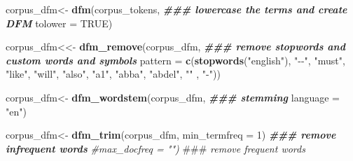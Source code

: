 \documentclass[
]{article}
\newenvironment{Shaded}{\begin{snugshade}}{\end{snugshade}}
\newcommand{\AlertTok}[1]{\textcolor[rgb]{0.94,0.16,0.16}{#1}}
\newcommand{\AttributeTok}[1]{\textcolor[rgb]{0.13,0.29,0.53}{#1}}
\newcommand{\CommentTok}[1]{\textcolor[rgb]{0.56,0.35,0.01}{\textit{#1}}}
\newcommand{\ConstantTok}[1]{\textcolor[rgb]{0.56,0.35,0.01}{#1}}
\newcommand{\DecValTok}[1]{\textcolor[rgb]{0.00,0.00,0.81}{#1}}
\newcommand{\DocumentationTok}[1]{\textcolor[rgb]{0.56,0.35,0.01}{\textbf{\textit{#1}}}}
\newcommand{\FunctionTok}[1]{\textcolor[rgb]{0.13,0.29,0.53}{\textbf{#1}}}
\newcommand{\NormalTok}[1]{#1}
\newcommand{\OtherTok}[1]{\textcolor[rgb]{0.56,0.35,0.01}{#1}}
\newcommand{\StringTok}[1]{\textcolor[rgb]{0.31,0.60,0.02}{#1}}
\begin{document}
\begin{Shaded}
\begin{Highlighting}[]
\NormalTok{corpus\_dfm}\OtherTok{\textless{}{-}} \FunctionTok{dfm}\NormalTok{(corpus\_tokens,                                           }\DocumentationTok{\#\#\# lowercase the terms and create DFM}
                       \AttributeTok{tolower =} \ConstantTok{TRUE}\NormalTok{)}
\end{Highlighting}
\end{Shaded}

\begin{Shaded}
\begin{Highlighting}[]
\NormalTok{corpus\_dfm}\OtherTok{\textless{}\textless{}{-}}  \FunctionTok{dfm\_remove}\NormalTok{(corpus\_dfm,                                     }\DocumentationTok{\#\#\# remove stopwords and custom words and symbols }
                        \AttributeTok{pattern =} \FunctionTok{c}\NormalTok{(}\FunctionTok{stopwords}\NormalTok{(}\StringTok{"english"}\NormalTok{), }\StringTok{"{-}{-}"}\NormalTok{, }\StringTok{"must"}\NormalTok{, }\StringTok{"like"}\NormalTok{, }\StringTok{"will"}\NormalTok{, }\StringTok{"also"}\NormalTok{, }\StringTok{"a1"}\NormalTok{, }\StringTok{"abba"}\NormalTok{, }\StringTok{"abdel"}\NormalTok{, }\StringTok{"\textquotesingle{}"}\NormalTok{ , }\StringTok{"{-}"}\NormalTok{)) }
\end{Highlighting}
\end{Shaded}

\begin{Shaded}
\begin{Highlighting}[]
\NormalTok{corpus\_dfm}\OtherTok{\textless{}{-}} \FunctionTok{dfm\_wordstem}\NormalTok{(corpus\_dfm,                                     }\DocumentationTok{\#\#\# stemming  }
                        \AttributeTok{language =} \StringTok{"en"}\NormalTok{)    }
\end{Highlighting}
\end{Shaded}

\begin{Shaded}
\begin{Highlighting}[]
\NormalTok{corpus\_dfm}\OtherTok{\textless{}{-}} \FunctionTok{dfm\_trim}\NormalTok{(corpus\_dfm,}
                      \AttributeTok{min\_termfreq =} \DecValTok{1}\NormalTok{)                              }\DocumentationTok{\#\#\# remove infrequent words}
                      \CommentTok{\#max\_docfreq = "")                             }\AlertTok{\#\#\#}\CommentTok{ remove frequent words }
\end{Highlighting}
\end{Shaded}
\end{document}
